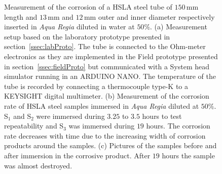 \documentclass[journal,twoside,web]{ieeecolor}
\begin{document}
\begin{figure}[!t]
\centering
{}
\caption{Measurement of the corrosion of a HSLA steel tube of $150$\,mm length and $13$\,mm and $12$\,mm outer and inner diameter respectively inserted in \textit{Aqua Regia} diluted in water at $50\%$. (a) Measurement setup based on the laboratory prototype presented in section~\ref{ssec:labProto}. The tube is connected to the Ohm-meter electronics as they are implemented in the Field prototype presented in section~\ref{ssec:fieldProto} but communicated with a System head simulator running in an ARDUINO NANO. The temperature of the tube is recorded by connecting a thermocouple type-K to a KEYSIGHT digital multimeter. (b) Measurement of the corrosion rate of HSLA steel samples immersed in \textit{Aqua Regia} diluted at $50\%$. S$_{1}$ and S$_{2}$ were immersed during $3.25$ to $3.5$ hours to test repeatability and S$_{3}$ was immersed during $19$ hours. The corrosion rate decreases with time due to the increasing width of corrosion products around the samples. (c) Pictures of the samples before and after immersion in the corrosive product. After $19$ hours the sample was almost destroyed.}
\label{fig:aquaRegia}
\end{figure}
\end{document}
